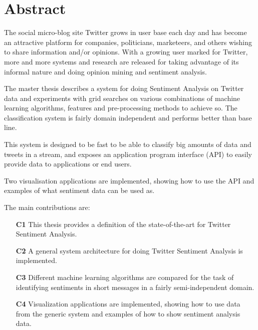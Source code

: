 \section*{Abstract}

The social micro-blog site Twitter grows in user base each day and has become an attractive platform for companies, politicians, marketeers, and others wishing to share information and/or opinions. With a growing user marked for Twitter, more and more systems and research are released for taking advantage of its informal nature and doing opinion mining and sentiment analysis. 

The master thesis describes a system for doing Sentiment Analysis on Twitter data and experiments with grid searches on various combinations of machine learning algorithms, features and pre-processing methods to achieve so. The classification system is fairly domain independent and performs better than base line. 

This system is designed to be fast to be able to classify big amounts of data and tweets in a stream, and exposes an application program interface (API) to easily provide data to applications or end users. 

Two visualisation applications are implemented, showing how to use the API and examples of what sentiment data can be used as.

The main contributions are: 

\begin{itemize}
\item[\textbf{C1}] This thesis provides a definition of the state-of-the-art for Twitter Sentiment Analysis.

\item[\textbf{C2}] A general system architecture for doing Twitter Sentiment Analysis is implemented. 

\item[\textbf{C3}] Different machine learning algorithms are compared for the task of identifying sentiments in short messages in a fairly semi-independent domain.

\item[\textbf{C4}] Visualization applications are implemented, showing how to use data from the generic system and examples of how to show sentiment analysis data.
\end{itemize}

\cleardoublepage